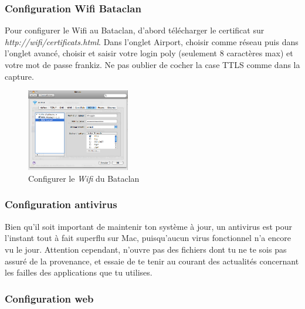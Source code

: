
\subsubsection{Configuration Wifi Bataclan}
Pour configurer le Wifi au Bataclan, d'abord télécharger le certificat sur \emph{http://wifi/certificats.html}.
Dans l'onglet Airport, choisir comme réseau  puis dans l'onglet avancé, choisir  et saisir votre login poly (seulement 8 caractères max) et votre mot de passe frankiz. Ne pas oublier de cocher la case TTLS comme dans la capture.

\begin{figure}[!hl]
    \begin{center}
      \includegraphics[width=0.4\textwidth]{images/mac_config_wifi.png} 
      \caption{Configurer le \emph{Wifi} du Bataclan}
    \end{center}
  \end{figure}


\subsubsection{Configuration antivirus}

Bien qu'il soit important de maintenir ton système à jour, un antivirus est pour l'instant tout à fait superflu sur Mac, puisqu'aucun virus fonctionnel n'a encore vu le jour. Attention cependant, n'ouvre pas des fichiers dont tu ne te sois pas assuré de la provenance, et essaie de te tenir au courant des actualités concernant les failles des applications que tu utilises.


\subsubsection{Configuration web}

